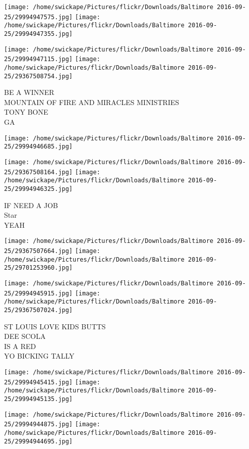 \documentclass[10pt,letterpaper]{article}
\begin{document}
\texttt{[image: /home/swickape/Pictures/flickr/Downloads/Baltimore 2016-09-25/29994947575.jpg]}
\texttt{[image: /home/swickape/Pictures/flickr/Downloads/Baltimore 2016-09-25/29994947355.jpg]}

\texttt{[image: /home/swickape/Pictures/flickr/Downloads/Baltimore 2016-09-25/29994947115.jpg]}
\texttt{[image: /home/swickape/Pictures/flickr/Downloads/Baltimore 2016-09-25/29367508754.jpg]}

BE A WINNER\\
MOUNTAIN OF FIRE AND MIRACLES MINISTRIES\\
TONY BONE\\
GA\\
\pagebreak

\texttt{[image: /home/swickape/Pictures/flickr/Downloads/Baltimore 2016-09-25/29994946685.jpg]}

\vspace{0.25in}
\texttt{[image: /home/swickape/Pictures/flickr/Downloads/Baltimore 2016-09-25/29367508164.jpg]}
\texttt{[image: /home/swickape/Pictures/flickr/Downloads/Baltimore 2016-09-25/29994946325.jpg]}

IF NEED A JOB\\
Star\\
YEAH\\
\pagebreak

\texttt{[image: /home/swickape/Pictures/flickr/Downloads/Baltimore 2016-09-25/29367507664.jpg]}
\texttt{[image: /home/swickape/Pictures/flickr/Downloads/Baltimore 2016-09-25/29701253960.jpg]}

\texttt{[image: /home/swickape/Pictures/flickr/Downloads/Baltimore 2016-09-25/29994945915.jpg]}
\texttt{[image: /home/swickape/Pictures/flickr/Downloads/Baltimore 2016-09-25/29367507024.jpg]}

ST LOUIS LOVE KIDS BUTTS\\
DEE SCOLA\\
IS A RED\\
YO BICKING TALLY\\
\pagebreak

\texttt{[image: /home/swickape/Pictures/flickr/Downloads/Baltimore 2016-09-25/29994945415.jpg]}
\texttt{[image: /home/swickape/Pictures/flickr/Downloads/Baltimore 2016-09-25/29994945135.jpg]}

\texttt{[image: /home/swickape/Pictures/flickr/Downloads/Baltimore 2016-09-25/29994944875.jpg]}
\texttt{[image: /home/swickape/Pictures/flickr/Downloads/Baltimore 2016-09-25/29994944695.jpg]}
\end{document}
